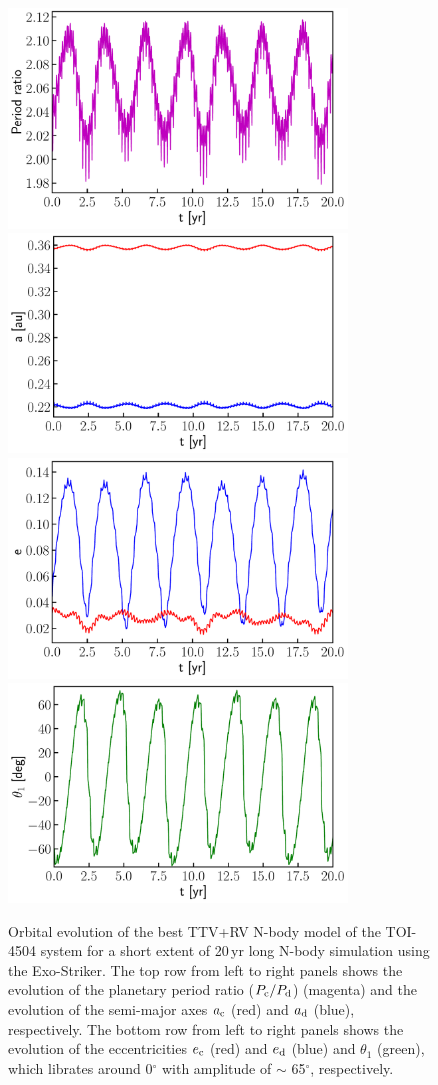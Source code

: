 \documentclass[twocolumn,twocolappendix]{aastex631}
\begin{document}
\begin{figure}


\includegraphics[width=9cm]{evol_Prat.pdf}
\includegraphics[width=9cm]{evol_a.pdf} \\
\includegraphics[width=9cm]{evol_e.pdf} 
\includegraphics[width=9cm]{evol_t1.pdf} 
\caption{Orbital evolution of the best TTV+RV N-body model of the TOI-4504 system for a short extent of 20\,yr long N-body simulation using the {\textsc Exo-Striker}. The top row from left to right panels shows the evolution of the planetary period ratio ($P_{\rm c} / P_{\rm d}$) (magenta) and the evolution of the semi-major axes $a_{\rm c}$ (red) and $a_{\rm d}$ (blue), respectively. The bottom row from left to right panels shows the evolution of the eccentricities $e_{\rm c}$ (red) and $e_{\rm d}$ (blue) and $\theta_1$ (green), which librates around 0$^{\circ}$ with amplitude of $\sim$ 65$^{\circ}$, respectively. }
\label{evol_plot} 
\end{figure}
\end{document}
